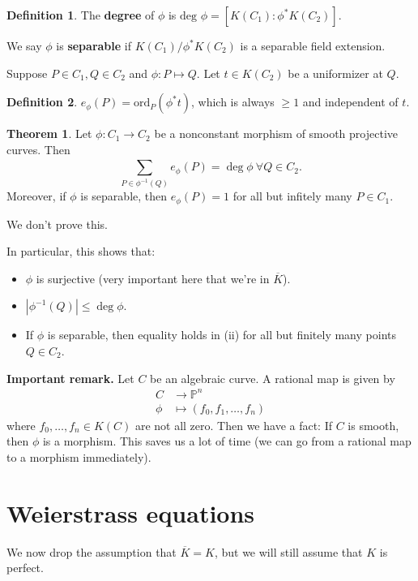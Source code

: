 \documentclass{article}
\theoremstyle{definition}
\newtheorem{theorem}{Theorem}[section]
\newtheorem{defn}{Definition}[section]
\begin{document}
\begin{defn}
    The \textbf{degree} of $\phi$ is $\text{deg }\phi = [K(C_1) : \phi^* K(C_2)]$.
    \vspace{1mm}
     
    We say $\phi$ is \textbf{separable} if $K(C_1)/\phi^* K(C_2)$ is a separable field extension.
\end{defn}

Suppose $P \in C_1, Q \in C_2$ and $\phi : P \mapsto Q$. Let $t \in K(C_2)$ be a uniformizer at $Q$.
\begin{defn}
    $e_{\phi}(P) = \text{ord}_P(\phi^* t)$, which is always $\ge 1$ and independent of $t$.
\end{defn}
\begin{theorem}\label{theorem2.3}
    Let $\phi : C_1 \to C_2$ be a nonconstant morphism of smooth projective curves. Then \[
    \sum_{P \in \phi^{-1}(Q)}^{} e_{\phi}(P) = \deg \phi ~\forall  Q \in C_2.
    \]
    Moreover, if $\phi$ is separable, then $e_{\phi}(P)=1$ for all but infitely many $P \in C_1$.
\end{theorem}
We don't prove this.
\vspace{1mm}
 
In particular, this shows that:
\begin{itemize}
    \item $\phi$ is surjective (very important here that we're in $\overline{K}$).
    \item $|\phi^{-1}(Q)|\le \deg \phi$.
    \item If $\phi$ is separable, then equality holds in (ii) for all but finitely many points $Q \in C_2$.
\end{itemize}
\textbf{Important remark.} Let $C$ be an algebraic curve. A rational map is given by 
\begin{align*}
    C &\to \mathbb{P}^n \\
    \phi &\mapsto (f_0,f_1,\ldots,f_n)
\end{align*}
where $f_0,\ldots,f_n \in K(C)$ are not all zero. Then we have a fact: If $C$ is smooth, then $\phi$ is a morphism. This saves us a lot of time (we can go from a rational map to a morphism immediately).

\section{Weierstrass equations}

We now drop the assumption that $\overline{K} = K$, but we will still assume that $K$ is perfect.
\end{document}
